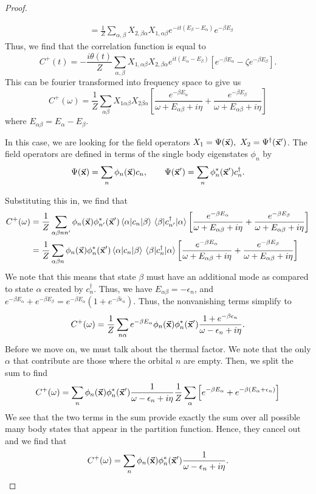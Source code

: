 \begin{proof}
\begin{tcolorbox}[title=Derivation of the Lehmann Representation, breakable]
\begin{align*}
								 &= \frac{1}{Z}\sum_{\alpha,\beta}{X}_{2,\beta\alpha}X_{1,\alpha\beta}e^{-it(E_\beta-E_\alpha)} e^{-\beta E_\beta} 
		\end{align*}
		Thus, we find that the correlation function is equal to
		\[
			C^+(t) = -\frac{i\theta(t)}{Z}\sum_{\alpha,\beta} X_{1,\alpha\beta}X_{2,\beta\alpha}e^{it(E_\alpha-E_\beta)}\left[ e^{-\beta E_\alpha} - \zeta e^{-\beta E_\beta} \right] 
		.\] 
		This can be fourier transformed into frequency space to give us
		\[
	C^+(\omega) = \frac 1Z \sum_{\alpha\beta}X_{1\alpha\beta}X_{2\beta\alpha}\left[\frac{e^{-\beta E_\alpha}}{\omega+E_{\alpha\beta}+i\eta}+\frac{e^{-\beta E_\beta}}{\omega+E_{\alpha\beta}+i\eta}\right]
		\] 
		where $E_{\alpha\beta}=E_\alpha - E_\beta$.
	\end{tcolorbox}
In this case, we are looking for the field operators $X_1=\Psi(\va x),~X_2 = \Psi^\dagger(\va x') $. The field operators are defined in terms of the single body eigenstates $\phi_n$ by
\[
\Psi(\va x) = \sum_n \phi_n(\va x)c_n,\qquad \Psi(\va x') = \sum_n \phi_n^*(\va x')c_n^\dagger
.\] 


Substituting this in, we find that
\begin{align*}
	C^+(\omega) &= \frac{1}{Z}\sum_{\alpha\beta nn'}\phi_n(\va x)\phi_{n'}^*(\va x')\mel{\alpha}{c_n}{\beta}\mel{\beta}{c_{n'}^\dagger}{\alpha}  \left[\frac{e^{-\beta E_\alpha}}{\omega+E_{\alpha\beta}+i\eta}+\frac{e^{-\beta E_\beta}}{\omega+E_{\alpha\beta}+i\eta}\right]\\
	 &= \frac{1}{Z}\sum_{\alpha\beta n}\phi_n(\va x)\phi_n^*(\va x')\mel{\alpha}{c_n}{\beta}\mel{\beta}{c_{n}^\dagger}{\alpha}  \left[\frac{e^{-\beta E_\alpha}}{\omega+E_{\alpha\beta}+i\eta}+\frac{e^{-\beta E_\beta}}{\omega+E_{\alpha\beta}+i\eta}\right]
\end{align*}
We note that this means that state $\beta$ must have an additional mode as compared to state $\alpha$ created by $c_n^\dagger$. Thus, we have $E_{\alpha\beta} = -\epsilon_n$, and $e^{-\beta E_\alpha} + e^{-\beta E_\beta} = e^{-\beta E_\alpha}(1 + e^{-\beta \epsilon_n})$. Thus, the nonvanishing terms simplify to
\[
	C^+(\omega) = \frac{1}{Z}\sum_{n\alpha} e^{-\beta E_\alpha}\phi_n(\va x)\phi_n^*(\va x') \frac{1+e^{-\beta\epsilon_n}}{\omega- \epsilon_n + i\eta}
.\] 
Before we move on, we must talk about the thermal factor. We note that the only $\alpha$ that contribute are those where the orbital $n$ are empty. Then, we split the sum to find
\[
	C^+(\omega) = \sum_n \phi_n(\va x)\phi_n^*(\va x')\frac{1}{\omega-\epsilon_n+i\eta} \frac{1}{Z}\sum_\alpha \left[e^{-\beta E_\alpha}+e^{-\beta(E_\alpha + \epsilon_n)}\right]  
\]
We see that the two terms in the sum provide exactly the sum over all possible many body states that appear in the partition function. Hence, they cancel out and we find that
\[
	C^+(\omega) = \sum_n \phi_n(\va x)\phi_n^*(\va x') \frac{1}{\omega - \epsilon_n + i\eta}
.\] 


\end{proof}
